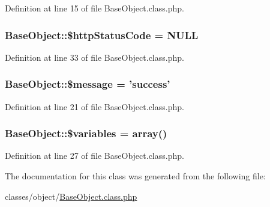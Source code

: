 Definition at line 15 of file Base\-Object.\-class.\-php.

\hypertarget{classBaseObject_aa84e26782db1a911815cd6b9a5a093f9}{
\subsubsection[{\$http\-Status\-Code}]{\setlength{\rightskip}{0pt plus 5cm}Base\-Object\-::\$http\-Status\-Code = N\-U\-L\-L}}\label{classBaseObject_aa84e26782db1a911815cd6b9a5a093f9}


Definition at line 33 of file Base\-Object.\-class.\-php.

\hypertarget{classBaseObject_a74c72729f60c2ba14879a9311ac77419}{
\subsubsection[{\$message}]{\setlength{\rightskip}{0pt plus 5cm}Base\-Object\-::\$message = 'success'}}\label{classBaseObject_a74c72729f60c2ba14879a9311ac77419}


Definition at line 21 of file Base\-Object.\-class.\-php.

\hypertarget{classBaseObject_a4b5e3eabeb5a42286650df6636001a0b}{
\subsubsection[{\$variables}]{\setlength{\rightskip}{0pt plus 5cm}Base\-Object\-::\$variables = array()}}\label{classBaseObject_a4b5e3eabeb5a42286650df6636001a0b}


Definition at line 27 of file Base\-Object.\-class.\-php.



The documentation for this class was generated from the following file\-:\begin{DoxyCompactItemize}
\item 
classes/object/\hyperlink{BaseObject_8class_8php}{Base\-Object.\-class.\-php}\end{DoxyCompactItemize}
